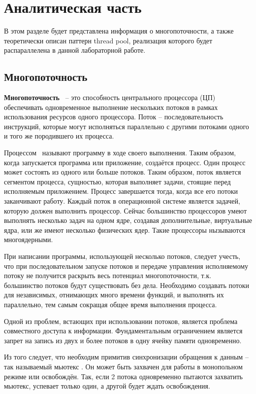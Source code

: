 \chapter{Аналитическая часть}
В этом разделе будет представлена информация о многопоточности, а также теоретически описан паттерн thread pool, реализация которого будет распараллелена в данной лабораторной работе. 

\section{Многопоточность}
\textbf{Многопоточность}~\cite{multithreading} -- это способность центрального процессора (ЦП) обеспечивать одновременное выполнение нескольких потоков в рамках использования ресурсов одного процессора. Поток -- последовательность инструкций, которые могут исполняться параллельно с другими потоками одного и того же породившего их процесса.

Процессом~\cite{process} называют программу в ходе своего выполнения. Таким образом, когда запускается программа или приложение, создаётся процесс. Один процесс может состоять из одного или больше потоков.
Таким образом, поток является сегментом процесса, сущностью, которая выполняет задачи, стоящие перед исполняемым приложением. 
Процесс завершается тогда, когда все его потоки заканчивают работу.
Каждый поток в операционной системе является задачей, которую должен выполнить процессор. Сейчас большинство процессоров умеют выполнять несколько задач на одном ядре, создавая дополнительные, виртуальные ядра, или же имеют несколько физических ядер. Такие процессоры нызываются многоядерными. 

При написании программы, использующей несколько потоков, следует учесть, что при последовательном запуске потоков и передаче управления исполняемому потоку не получится раскрыть весь потенциал многопоточности, т.к. большинство потоков будут существовать без дела.
Необходимо создавать потоки для независимых, отнимающих много времени функций, и выполнять их параллельно, тем самым сокращая общее время выполнения процесса.


Одной из проблем, встающих при использовании потоков, является проблема совместного доступа к информации. Фундаментальным ограничением является запрет на запись из двух и более потоков в одну ячейку памяти одновременно.

Из того следует, что необходим примитив синхронизации обращения к данным -- так называемый мьютекс . 
Он может быть захвачен для работы в монопольном режиме или освобождён. 
Так, если 2 потока одновременно пытаются захватить мьютекс, успевает только один, а другой будет ждать освобождения. 


